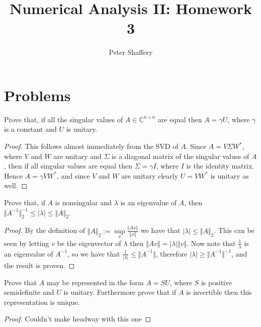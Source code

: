 \documentclass[10pt,a4paper]{article}
\newenvironment{problem}[2][Problem]{\begin{trivlist}
\item[\hskip \labelsep {\bfseries #1}\hskip \labelsep {\bfseries #2.}]}{\end{trivlist}}
\begin{document}
\author{Peter Shaffery}
\title{Numerical Analysis II: Homework 3}
\maketitle
\section{Problems}
\begin{problem}{1a}
Prove that, if all the singular values of $A \in \mathbb{C}^{n \times n}$ are equal then $A = \gamma U$, where $\gamma$ is a constant and $U$ is unitary.
\end{problem}
\begin{proof}
This follows almost immediately from the SVD of $A$.  Since $A = V \Sigma W^*$, where $V$ and $W$ are unitary and $\Sigma$ is a diagonal matrix of the singular values of $A$, then if all singular values are equal then $\Sigma = \gamma I$, where $I$ is the identity matrix.  Hence $A = \gamma V W^*$, and since $V$ and $W$ are unitary clearly $U = V W^*$ is unitary as well.
\end{proof}


\begin{problem}{1b}
Prove that, if $A$ is nonsingular and $\lambda$ is an eigenvalue of $A$, then $\Vert A^{-1} \Vert_2^{-1} \leq \vert \lambda \vert \leq \Vert A \Vert_2$.  
\end{problem}
\begin{proof}
  By the definition of $\Vert A \Vert_2 := \sup\limits_x \frac{\Vert Ax \Vert}{\Vert x \Vert}$ we have that $\vert \lambda \vert \leq \Vert A \Vert_2$.  This can be seen by letting $v$ be the eigenvector of $\lambda$ then $\Vert A v \Vert = |\lambda| \Vert v \Vert$.  Now note that $\frac{1}{\lambda}$ is an eigenvalue of $A^{-1}$, so we have that $\frac{1}{|\lambda|} \leq \Vert A^{-1} \Vert$, therefore $|\lambda| \geq \Vert A^{-1} \Vert^{-1}$, and the result is proven.
\end{proof}

\begin{problem}{1c}
Prove that $A$ may be represented in the form $A = S U$, where $S$ is positive semidefinite and $U$ is unitary.  Furthermore prove that if $A$ is invertible then this representation is unique.
\end{problem}
\begin{proof}
Couldn't make headway with this one
\end{proof}
\end{document}
